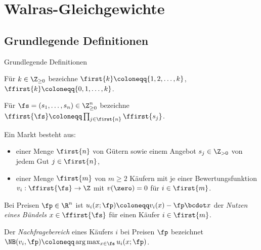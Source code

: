 \section{Walras-Gleichgewichte}
\subsection{Grundlegende Definitionen}

\begin{frame}{Grundlegende Definitionen}
	\begin{notation}
		Für $k\in\Z_{\geq0}$ bezeichne $\first{k}\coloneqq \{ 1, 2, \dots, k \}$, $\ffirst{k}\coloneqq \{0, 1, \dots, k \}$.
		
		\pause
		Für $\fs=(s_1, \dots, s_n)\in\Z_{\geq0}^n$ bezeichne $\ffirst{\fs}\coloneqq \prod_{j\in\first{n}} \ffirst{s_j}$.
	\end{notation}
	\begin{definition}[Markt]
		Ein Markt besteht aus:
		\begin{itemize}[label=\color{darkblue}$\bullet$]
			\item einer Menge $\first{n}$ von Gütern sowie einem Angebot $s_j\in\Z_{>0}$ von jedem Gut $j\in\first{n}$,
			\item einer Menge $\first{m}$ von $m\geq 2$ Käufern mit je einer Bewertungsfunktion $v_i:\ffirst{\fs} \rightarrow \Z$ mit $v(\zero) = 0$ für $i\in\first{m}$.
		\end{itemize}
	\end{definition}
	\begin{definition}[Nachfragebereich]
		Bei Preisen $\fp\in\R^n$ ist $u_i(x; \fp)\coloneqq v_i(x) - \fp \bcdot x$ der \emph{Nutzen eines Bündels} $x\in\ffirst{\fs}$ für einen Käufer $i\in\first{m}$.
		
		Der \emph{Nachfragebereich} eines Käufers $i$ bei Preisen $\fp$ bezeichnet $\NB(v_i, \fp)\coloneqq \arg\max_{x\in\fs} u_i(x; \fp)$.
	\end{definition}
\end{frame}

